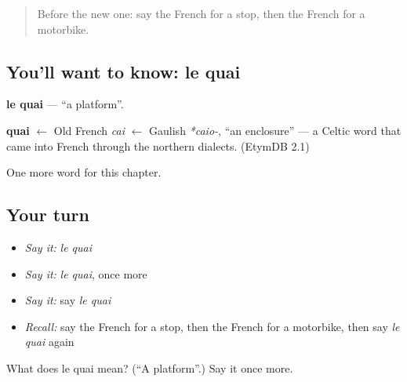 \label{lesson:FR-C247-quai}



\begin{quote}
Before the new one: say the French for a stop, then the French for a motorbike.
\end{quote}

\subsection*{You'll want to know: le quai}
\textbf{le quai} — \textquotedblleft{}a platform\textquotedblright{}.

\begin{cousinweb}
\textbf{quai} $\leftarrow$ Old French \emph{cai} $\leftarrow$ Gaulish \emph{*caio-}, \textquotedblleft{}an enclosure\textquotedblright{} — a Celtic word that came into French through the northern dialects. (EtymDB 2.1)
\end{cousinweb}

\begin{grammarlens}[title={What you've built}]
One more word for this chapter.
\end{grammarlens}

\subsection*{Your turn}
\begin{itemize}
\raggedright
  \item \emph{Say it:} \emph{le quai}
  \item \emph{Say it:} \emph{le quai}, once more
  \item \emph{Say it:} say \emph{le quai}
  \item \emph{Recall:} say the French for a stop, then the French for a motorbike, then say \emph{le quai} again
\end{itemize}

\begin{tcolorbox}[breakable,colback=teal!4,colframe=teal!35!black,title={Before you move on}]
What does le quai mean? (\textquotedblleft{}A platform\textquotedblright{}.) Say it once more.
\end{tcolorbox}

